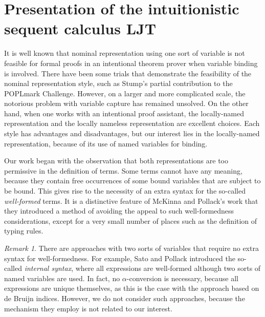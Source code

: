\documentclass{kms-j}
\theoremstyle{plain}
\theoremstyle{remark}
\newtheorem{rem}[thm]{Remark}
\begin{document}
\section{Presentation of the intuitionistic sequent calculus LJT}\label{sec:ljt}

It is well known that nominal representation using one sort of variable is not
feasible for formal proofs in an intentional theorem prover
when variable binding is involved.
There have been some trials that demonstrate the feasibility of the nominal representation style,
such as Stump's partial contribution to the POPLmark
Challenge\cite{Stump}.
However, on a larger and more complicated scale, the notorious problem
with variable capture has remained unsolved.
On the other hand, when one works with an intentional proof assistant,
the locally-named representation \citep{McKinna1993,McKinna1999}
and the locally nameless representation \citep{Aydemir2008,Chargueraud2012}
are excellent choices.
Each style has advantages and disadvantages,
but our interest lies in the locally-named representation, because of its use of named variables for binding.

Our work began with the observation that both representations are too permissive
in the definition of terms.
Some  terms cannot have any meaning, because they contain free occurrences of
some bound variables that are subject to be bound.
This gives rise to the necessity of an extra syntax for the so-called \textit{well-formed} terms.
It is a distinctive feature of McKinna and Pollack's work that
they introduced a method of avoiding the appeal to such
well-formedness considerations, except for a very small number of places such as the definition of typing rules.

\begin{rem}
There are approaches with two sorts of variables that require no extra syntax for well-formedness.
For example, Sato and Pollack \citep{Sato2010} introduced the so-called \textit{internal syntax}, where all expressions are well-formed although two sorts of named variables are used.
In fact, no $\alpha$-conversion is necessary, because all expressions are unique themselves,
as this is the case with the approach based on de Bruijn indices.
However, we do not consider such approaches, because the mechanism
they employ is not related to our interest.
\end{rem}
\end{document}

